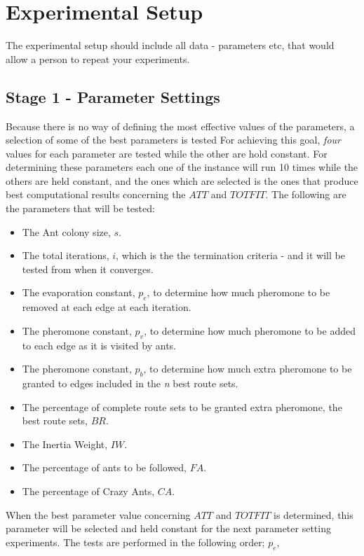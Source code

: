 \section{Experimental Setup}

The experimental setup should include all data - parameters etc, that would allow a person to repeat your experiments. 
 
\subsection{Stage 1 - Parameter Settings}
\label{subsec:parameterSettings_setup}

Because there is no way of defining the most effective values of the parameters, a selection of some of the best parameters is tested For achieving this goal, \textit{four} values for each parameter are tested while the other are hold constant. For determining these parameters each one of the instance will run 10 times while the others are held constant, and the ones which are selected is the ones that produce best computational results concerning the $ATT$ and $TOTFIT$. The following are the parameters that will be tested:

\begin{itemize}
\item The Ant colony size, $s$.
\item The total iterations, $i$, which is the the termination criteria - and it will be tested from when it converges. 
\item The evaporation constant, $p_{e}$, to determine how much pheromone to be removed at each edge at each iteration. 
\item The pheromone constant, $p_{v}$, to determine how much pheromone to be added to each edge as it is visited by ants. 
\item The pheromone constant, $p_{b}$, to determine how much extra pheromone to be granted to edges included in the \textit{n} best route sets.
\item The percentage of complete route sets to be granted extra pheromone, the best route sets, $BR$.
\item The Inertia Weight, $IW$.
\item The percentage of ants to be followed, $FA$.
\item The percentage of Crazy Ants, $CA$.
\end{itemize}

When the best parameter value concerning $ATT$ and $TOTFIT$ is determined, this parameter will be selected and held constant for the next parameter setting experiments. The tests are performed in the following order; $p_{e}$, 

